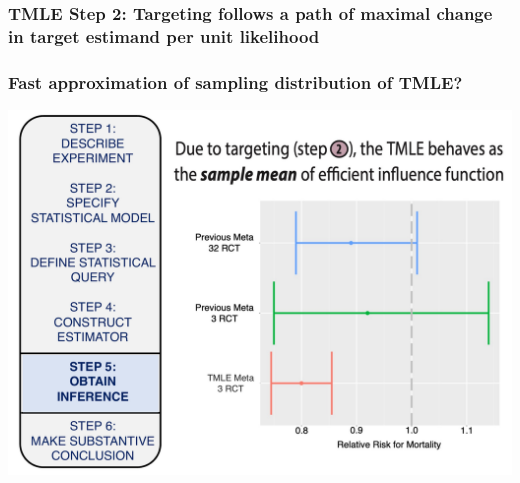 \documentclass[t]{beamer}
\begin{document}
\begin{frame}
\frametitle{TMLE Step 2: Targeting follows a path of maximal change in target estimand per unit likelihood}
\vspace{-12pt}
\centering
\begin{figure}
\centering
{}
\end{figure}
\end{frame}


\begin{frame}
  \frametitle{Fast approximation of sampling distribution of TMLE?}
  \vspace{-20pt}
  \begin{center}
  \includegraphics[width = 1.05\textwidth]{figures/roadmap5.pdf}
  \end{center}
\end{frame}



\end{document}
